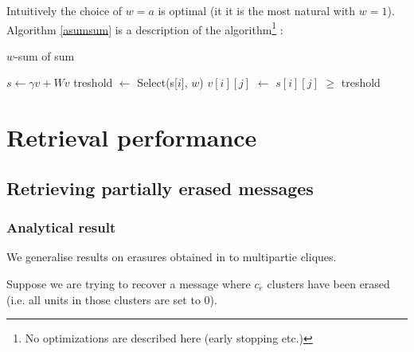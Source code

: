 \documentclass[english,11pt,twocolumn]{article}
\renewcommand{\ge}{\geqslant}
\newcommand*\Let[2]{\State #1 $\gets$ #2}
\theoremstyle{definition}
\begin{document}
		Intuitively the choice of $w = a$ is optimal (it it is the most natural with $w = 1$).
		Algorithm \ref{asumsum} is a description of the algorithm\footnote{No optimizations are described here (early stopping etc.)} :
		\begin{algorithm}[!htb]
		\caption{$w$-sum of sum \label{asumsum}}
		\begin{algorithmic}[1]
		\State $s \gets \gamma v + W v$
			\Let{treshold}{Select(s[$i$], $w$)} 
			\Let{$v[i][j]$}{$s[i][j]$ $\ge$ treshold}
			\EndFor
		\EndFor
		\EndFor
		\EndProcedure
		\end{algorithmic}
		\end{algorithm}

	\section{Retrieval performance}	
	

	\subsection{Retrieving partially erased messages}		
		
	\subsubsection{Analytical result}
		
	
	
	
	
	
	
	We generalise results on erasures obtained in \cite{GriBer20117} to multipartie cliques.
	
	Suppose we are trying to recover a message where $c_e$ clusters have been erased (i.e. all units in those clusters are set to $0$).
	
\end{document}
